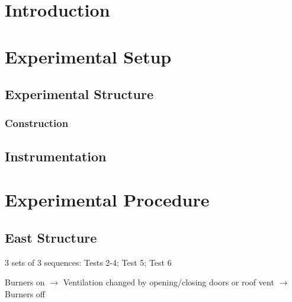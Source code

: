 \documentclass[12pt,oneside]{book}
\begin{document}
\mainmatter

\chapter{Introduction}
\label{chap:Introduction}

\chapter{Experimental Setup}
\label{chap:Experimental_Setup}

\section{Experimental Structure}
\label{sec:Experimental_Structure}

\subsection{Construction}
\label{sec:Construction}

\section{Instrumentation}
\label{sec:Instrumentation}

\chapter{Experimental Procedure}
\label{chap:Experimental_Procedure}

\section{East Structure}
3 sets of 3 sequences: Tests 2-4; Test 5; Test 6

Burners on $\rightarrow$ Ventilation changed by opening/closing doors or roof vent $\rightarrow$ Burners off
\end{document}
